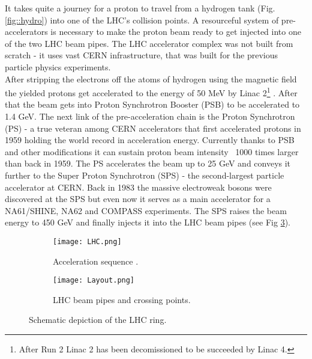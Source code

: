         It takes quite a journey for a proton to travel from a hydrogen tank (Fig. \ref{fig::hydro}) into one of the LHC's collision points. A resourceful system of pre-accelerators is necessary to make the proton beam ready to get injected into one of the two LHC beam pipes. The LHC accelerator complex was not built from scratch - it uses vast CERN infrastructure, that was built for the previous particle physics experiments. \\
        After stripping the electrons off the atoms of hydrogen using the magnetic field the yielded protons get accelerated to the energy of 50 MeV by Linac 2\footnote{After Run 2 Linac 2 has been decomissioned to be succeeded by Linac 4.} \cite{sequence}. After that the beam gets into Proton Synchrotron Booster (PSB) to be accelerated to 1.4 GeV. The next link of the pre-acceleration chain is the Proton Synchrotron (PS) - a true veteran among CERN accelerators that first accelerated protons in 1959 holding the world record in acceleration energy. Currently thanks to PSB and other modifications it can sustain proton beam intensity ~1000 times larger than back in 1959. The PS accelerates the beam up to 25 GeV and conveys it further to the Super Proton Synchrotron (SPS) - the second-largest particle accelerator at CERN. Back in 1983 the massive electroweak bosons were discovered at the SPS but even now it serves as a main accelerator for a NA61/SHINE, NA62 and COMPASS experiments. The SPS raises the beam energy to 450 GeV and finally injects it into the LHC beam pipes (see Fig \ref{fig::layout}).\\
   

	\begin{figure}[htbp]
	\begin{subfigure}[t]{0.48\textwidth}
		\texttt{[image: LHC.png]}
		\caption[Acceleration sequence]{Acceleration sequence \cite{sequence}.}
		\label{fig::seq}
	\end{subfigure}
	\hfill
	\begin{subfigure}[t]{0.48\textwidth}
		\texttt{[image: Layout.png]}
		\caption[Beam pipes]{LHC beam pipes and crossing points.}
		\label{fig::pipes}
	\end{subfigure}
	\caption{Schematic depiction of the LHC ring.}
	\label{fig::layout}
\end{figure}

